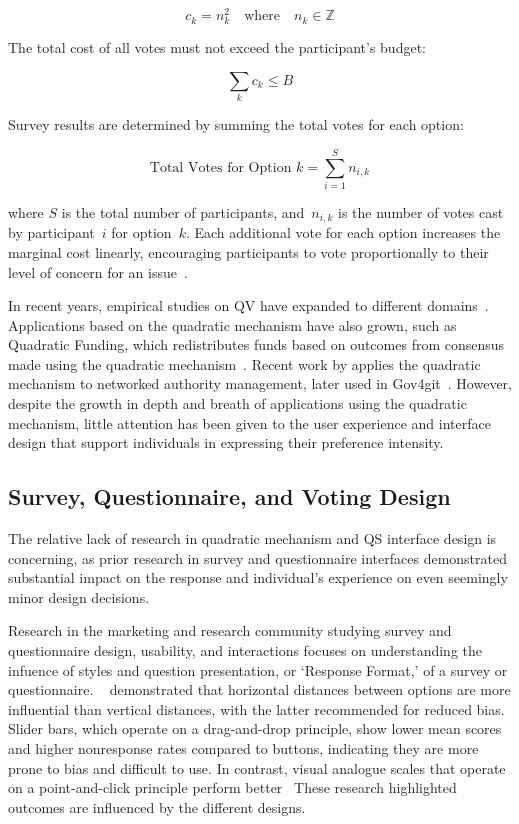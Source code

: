\[c_k = n_k^2 \quad \text{where}\quad n_k \in \mathbb{Z}\]

The total cost of all votes must not exceed the participant's budget:

\[\sum_k c_k \leq B\]

Survey results are determined by summing the total votes for each option:

\[ \text{Total Votes for Option } k = \sum_{i=1}^{S} n_{i,k} \]

where $S$ is the total number of participants, and~$n_{i,k}$ is the number of votes cast by participant~$i$ for option~$k$. Each additional vote for each option increases the marginal cost linearly, encouraging participants to vote proportionally to their level of concern for an issue~\cite{posner2018radical}.

In recent years, empirical studies on QV have expanded to different domains~\cite{naylor2017first, cavailleWhoCaresMeasuring}. Applications based on the quadratic mechanism have also grown, such as Quadratic Funding, which redistributes funds based on outcomes from consensus made using the quadratic mechanism~\cite{buterinFlexibleDesignFunding2019a, freitasQuadraticFundingIncomplete2024}. Recent work by \textcite{southPluralManagement2024} applies the quadratic mechanism to networked authority management, later used in Gov4git~\cite{Gov4gitDecentralizedPlatform2023}. However, despite the growth in depth and breath of applications using the quadratic mechanism, little attention has been given to the user experience and interface design that support individuals in expressing their preference intensity.

\subsection{Survey, Questionnaire, and Voting Design}
The relative lack of research in quadratic mechanism and QS interface design is concerning, as prior research in survey and questionnaire interfaces demonstrated substantial impact on the response and individual's experience on even seemingly minor design decisions. 

Research in the marketing and research community studying survey and questionnaire design, usability, and interactions focuses on understanding the infuence of styles and question presentation, or `Response Format,' of a survey or questionnaire. ~\textcite{weijtersExtremityHorizontalVertical2021} demonstrated that horizontal distances between options are more influential than vertical distances, with the latter recommended for reduced bias. Slider bars, which operate on a drag-and-drop principle, show lower mean scores and higher nonresponse rates compared to buttons, indicating they are more prone to bias and difficult to use. In contrast, visual analogue scales that operate on a point-and-click principle perform better~\cite{toepoelSlidersVisualAnalogue2018} These research highlighted outcomes are influenced by the different designs.

